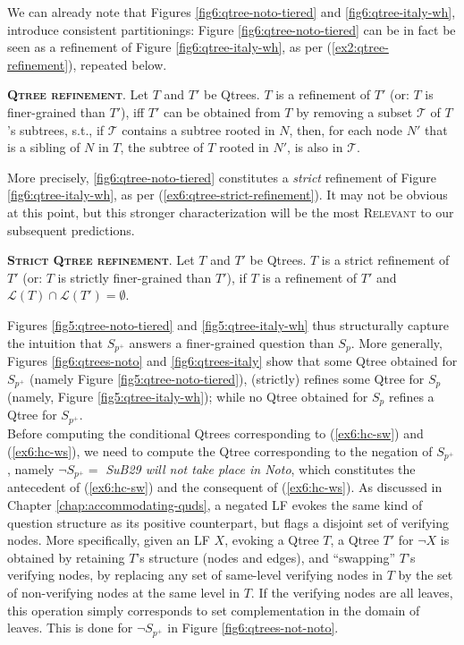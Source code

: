 We can already note that Figures \ref{fig6:qtree-noto-tiered} and \ref{fig6:qtree-italy-wh}, introduce consistent partitionings: Figure \ref{fig6:qtree-noto-tiered} can be in fact be seen as a refinement of Figure \ref{fig6:qtree-italy-wh}, as per (\ref{ex2:qtree-refinement}), repeated below. 

\begin{exe}
	 {\textsc{\textbf{Qtree refinement}}. Let $T$ and $T'$ be Qtrees. $T$ is a refinement of $T'$ (or: $T$ is finer-grained than $T'$), iff $T'$ can be obtained from $T$ by removing a subset $\mathcal{T}$ of $T$'s subtrees, s.t., if $\mathcal{T}$ contains a subtree rooted in $N$, then, for each node $N'$ that is a sibling of $N$ in $T$, the subtree of $T$ rooted in $N'$, is also in $\mathcal{T}$.}
\end{exe}

More precisely, \ref{fig6:qtree-noto-tiered} constitutes a \textit{strict} refinement of Figure \ref{fig6:qtree-italy-wh}, as per (\ref{ex6:qtree-strict-refinement}). It may not be obvious at this point, but this stronger characterization will be the most \textsc{Relevant} to our subsequent predictions.

\begin{exe}
	\ex\label{ex6:qtree-strict-refinement} {\textsc{\textbf{Strict Qtree refinement}}. Let $T$ and $T'$ be Qtrees. $T$ is a strict refinement of $T'$ (or: $T$ is strictly finer-grained than $T'$), if $T$ is a refinement of $T'$ and $\mathcal{L}(T)\cap\mathcal{L}(T') = \emptyset$.}
\end{exe}

Figures \ref{fig5:qtree-noto-tiered} and \ref{fig5:qtree-italy-wh} thus structurally capture the intuition that $S_{p^+}$ answers a finer-grained question than $S_p$. More generally, Figures \ref{fig6:qtrees-noto} and \ref{fig6:qtrees-italy} show that some Qtree obtained for $S_{p^+}$ (namely Figure \ref{fig5:qtree-noto-tiered}), (strictly) refines some Qtree for $S_p$ (namely, Figure \ref{fig5:qtree-italy-wh}); while no Qtree obtained for $S_p$ refines a Qtree for $S_{p^+}$.\\

Before computing the conditional Qtrees corresponding to (\ref{ex6:hc-sw}) and (\ref{ex6:hc-ws}), we need to compute the Qtree corresponding to the negation of $S_{p^+}$, namely $\neg S_{p^+} = $ \textit{SuB29 will not take place in Noto}, which constitutes the antecedent of (\ref{ex6:hc-sw}) and the consequent of (\ref{ex6:hc-ws}). As discussed in Chapter \ref{chap:accommodating-quds}, a negated LF evokes the same kind of question structure as its positive counterpart, but flags a disjoint set of verifying nodes. More specifically, given an LF $X$, evoking a Qtree $T$, a Qtree $T'$ for $\neg X$ is obtained by retaining $T$'s structure (nodes and edges), and ``swapping'' $T$'s verifying nodes, by replacing any set of same-level verifying nodes in $T$ by the set of non-verifying nodes at the same level in $T$. If the verifying nodes are all leaves, this operation simply corresponds to set complementation in the domain of leaves. This is done for $\neg S_{p^+}$ in Figure \ref{fig6:qtrees-not-noto}.

